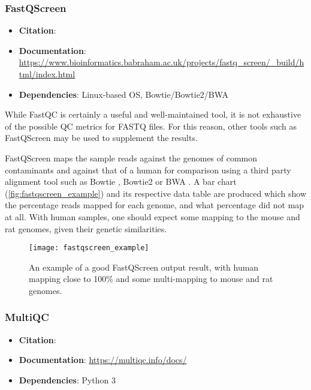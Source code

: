 \subsubsection{FastQScreen}
\begin{itemize}\itemsep-0.5em
\item[] \textbf{Citation}: 				\cite{wingett2018fastq}
\item[] \textbf{Documentation}: 	\url{https://www.bioinformatics.babraham.ac.uk/projects/fastq_screen/_build/html/index.html}
\item[] \textbf{Dependencies}: Linux-based OS, Bowtie/Bowtie2/BWA
\end{itemize}

While FastQC is certainly a useful and well-maintained tool, it is not exhaustive of the possible QC metrics for FASTQ files. For this reason, other tools such as FastQScreen may be used to supplement the results.

FastQScreen maps the sample reads against the genomes of common contaminants and against that of a human for comparison using a third party alignment tool such as Bowtie \citep{bowtie}, Bowtie2 \citep{bowtie2} or BWA \citep{bwa}. A bar chart (\autoref{fig:fastqscreen_example}) and its respective data table are produced which show the percentage reads mapped for each genome, and what percentage did not map at all. With human samples, one should expect some mapping to the mouse and rat genomes, given their genetic similarities.
\clearpage
\begin{figure}[!h]
    \centering
    \texttt{[image: fastqscreen\_example]}
    \caption[FastQScreen plot example]{An example of a good FastQScreen output result, with human mapping close to 100\% and some multi-mapping to mouse and rat genomes. } 
    \label{fig:fastqscreen_example}
\end{figure}

\subsubsection{MultiQC}

\begin{itemize}\itemsep-0.5em
\item[] \textbf{Citation}: 				\cite{multiqc}
\item[] \textbf{Documentation}: 	\url{https://multiqc.info/docs/}
\item[] \textbf{Dependencies}:  Python 3
\end{itemize}

